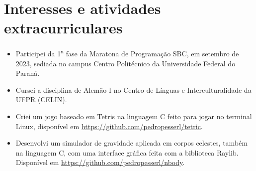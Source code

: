 \documentclass[a4paper, 12pt]{moderncv}
\begin{document}
\section{Interesses e atividades extracurriculares}
\vspace{4pt}
\begin{itemize}
    \item{Participei da 1\textsuperscript{a} fase da Maratona de Programação
        SBC, em setembro de 2023, sediada no campus Centro Politécnico da Universidade
        Federal do Paraná.}
    \vspace{4pt}
    \item{Cursei a disciplina de Alemão I no Centro de Línguas
        e Interculturalidade da UFPR (CELIN).}
    \vspace{4pt}
    \item{Criei um jogo baseado em Tetris na linguagem C feito para jogar no terminal
        Linux, disponível em \url{https://github.com/pedropesserl/tetric}.}
    \vspace{4pt}
    \item{Desenvolvi um simulador de gravidade aplicada em corpos celestes,
        também na linguagem C, com uma interface gráfica feita com a biblioteca
    Raylib. Disponível em \url{https://github.com/pedropesserl/nbody}.}
\end{itemize}
\end{document}
